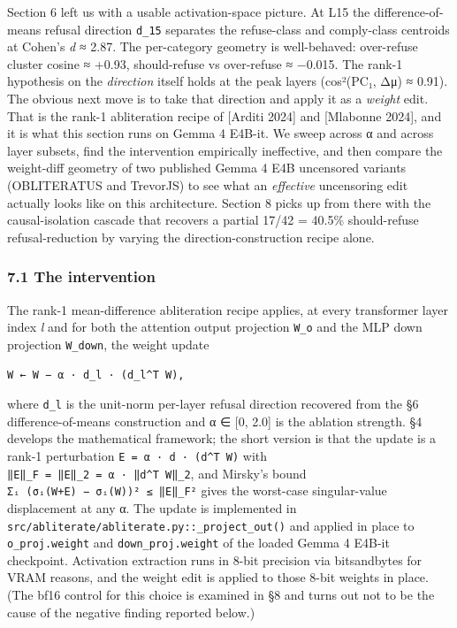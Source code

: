 \documentclass[
  11pt,
]{article}
\begin{document}
Section 6 left us with a usable activation-space picture. At L15 the
difference-of-means refusal direction \texttt{d\_15} separates the
refuse-class and comply-class centroids at Cohen's \emph{d} ≈ 2.87. The
per-category geometry is well-behaved: over-refuse cluster cosine ≈
+0.93, should-refuse vs over-refuse ≈ −0.015. The rank-1 hypothesis on
the \emph{direction} itself holds at the peak layers (cos²(PC₁, Δμ) ≈
0.91). The obvious next move is to take that direction and apply it as a
\emph{weight} edit. That is the rank-1 abliteration recipe of {[}Arditi
2024{]} and {[}Mlabonne 2024{]}, and it is what this section runs on
Gemma 4 E4B-it. We sweep across α and across layer subsets, find the
intervention empirically ineffective, and then compare the weight-diff
geometry of two published Gemma 4 E4B uncensored variants (OBLITERATUS
and TrevorJS) to see what an \emph{effective} uncensoring edit actually
looks like on this architecture. Section 8 picks up from there with the
causal-isolation cascade that recovers a partial 17/42 = 40.5\%
should-refuse refusal-reduction by varying the direction-construction
recipe alone.

\subsubsection{7.1 The intervention}\label{the-intervention}

The rank-1 mean-difference abliteration recipe applies, at every
transformer layer index \emph{l} and for both the attention output
projection \texttt{W\_o} and the MLP down projection \texttt{W\_down},
the weight update

\begin{verbatim}
W ← W − α · d_l · (d_l^T W),
\end{verbatim}

where \texttt{d\_l} is the unit-norm per-layer refusal direction
recovered from the §6 difference-of-means construction and α ∈ {[}0,
2.0{]} is the ablation strength. §4 develops the mathematical framework;
the short version is that the update is a rank-1 perturbation
\texttt{E\ =\ α\ ·\ d\ ·\ (d\^{}T\ W)} with
\texttt{‖E‖\_F\ =\ ‖E‖\_2\ =\ \textbar{}α\textbar{}\ ·\ ‖d\^{}T\ W‖\_2},
and Mirsky's bound \texttt{Σᵢ\ (σᵢ(W+E)\ −\ σᵢ(W))²\ ≤\ ‖E‖\_F²} gives
the worst-case singular-value displacement at any α. The update is
implemented in \texttt{src/abliterate/abliterate.py::\_project\_out()}
and applied in place to \texttt{o\_proj.weight} and
\texttt{down\_proj.weight} of the loaded Gemma 4 E4B-it checkpoint.
Activation extraction runs in 8-bit precision via bitsandbytes for VRAM
reasons, and the weight edit is applied to those 8-bit weights in place.
(The bf16 control for this choice is examined in §8 and turns out not to
be the cause of the negative finding reported below.)
\end{document}
